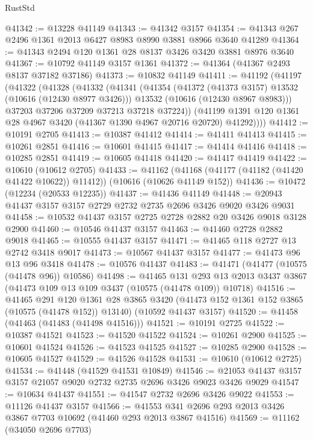 \begin{lexlean}{RustStd}
\begin{coremodule}
@41342 := @13228 @41149
@41343 := @41342 @3157
@41354 := @41343 @267 @2496 @1361 @2013 @6427 @8983 @8990 @3881 @8966 @3640 @41289
@41364 := @41343 @2494 @120 @1361 @28 @8137 @3426 @3420 @3881 @8976 @3640
@41367 := @10792 @41149 @3157 @1361
@41372 := @41364 (@41367 @2493 @8137 @37182 @37186)
@41373 := @10832 @41149
@41411 := @41192
    (@41197
      (@41322
        (@41328
          (@41332
            (@41341
              (@41354
                (@41372 (@41373 @3157) @13532 (@10616 (@12430 @8977 @3426)))
                @13532
                (@10616 (@12430 @8967 @8983)))
              @37203
              @37206
              @37209
              @37213
              @37218
              @37224))
          (@41199 @1391 @120 @1361 @28 @4967 @3420 (@41367 @1390 @4967 @20716 @20720) @41292))))
@41412 := @10191 @2705
@41413 := @10387 @41412
@41414 := @41411 @41413
@41415 := @10261 @2851
@41416 := @10601 @41415
@41417 := @41414 @41416
@41418 := @10285 @2851
@41419 := @10605 @41418
@41420 := @41417 @41419
@41422 := @10610 (@10612 @2705)
@41433 := @41162
    (@41168 (@41177 (@41182 (@41420 @41422 @10622)) @11412))
    (@10616 (@10626 @41149 @152))
@41436 := @10472 (@12234 (@20533 @12235))
@41437 := @41436 @41149
@41448 := @20943 @41437 @3157 @3157 @2729 @2732 @2735 @2696 @3426 @9020 @3426 @9031
@41458 := @10532 @41437 @3157 @2725 @2728 @2882 @20 @3426 @9018 @3128 @2900
@41460 := @10546 @41437 @3157
@41463 := @41460 @2728 @2882 @9018
@41465 := @10555 @41437 @3157
@41471 := @41465 @118 @2727 @13 @2742 @3418 @9017
@41473 := @10567 @41437 @3157
@41477 := @41473 @96 @13 @96 @3418
@41478 := @10576 @41437
@41483 := @41471 (@41477 (@10575 (@41478 @96)) @10586)
@41498 := @41465
    @131
    @293
    @13
    @2013
    @3437
    @3867
    (@41473 @109 @13 @109 @3437 (@10575 (@41478 @109)) @10718)
@41516 := @41465
    @291
    @120
    @1361
    @28
    @3865
    @3420
    (@41473 @152 @1361 @152 @3865 (@10575 (@41478 @152)) @13140)
    (@10592 @41437 @3157)
@41520 := @41458 (@41463 (@41483 (@41498 @41516)))
@41521 := @10191 @2725
@41522 := @10387 @41521
@41523 := @41520 @41522
@41524 := @10261 @2900
@41525 := @10601 @41524
@41526 := @41523 @41525
@41527 := @10285 @2900
@41528 := @10605 @41527
@41529 := @41526 @41528
@41531 := @10610 (@10612 @2725)
@41534 := @41448 (@41529 @41531 @10849)
@41546 := @21053 @41437 @3157 @3157 @21057 @9020 @2732 @2735 @2696 @3426 @9023 @3426 @9029
@41547 := @10634 @41437
@41551 := @41547 @2732 @2696 @3426 @9022
@41553 := @11126 @41437 @3157
@41566 := @41553 @341 @2696 @293 @2013 @3426 @3867 @7703 @10692 (@41460 @293 @2013 @3867 @41516)
@41569 := @11162 (@34050 @2696 @7703)

\end{coremodule}
\end{lexlean}
